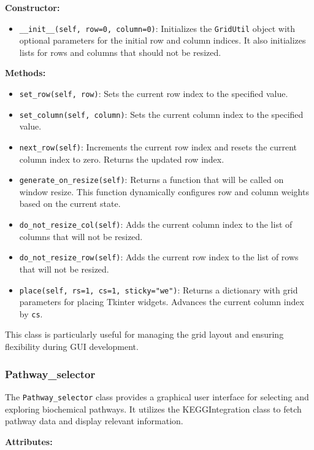 \textbf{Constructor:}

\begin{itemize}
\item \texttt{\_\_init\_\_(self, row=0, column=0)}: Initializes the \texttt{GridUtil} object with optional parameters for the initial row and column indices. It also initializes lists for rows and columns that should not be resized.
\end{itemize}

\textbf{Methods:}

\begin{itemize}
\item \texttt{set\_row(self, row)}: Sets the current row index to the specified value.
\item \texttt{set\_column(self, column)}: Sets the current column index to the specified value.
\item \texttt{next\_row(self)}: Increments the current row index and resets the current column index to zero. Returns the updated row index.
\item \texttt{generate\_on\_resize(self)}: Returns a function that will be called on window resize. This function dynamically configures row and column weights based on the current state.
\item \texttt{do\_not\_resize\_col(self)}: Adds the current column index to the list of columns that will not be resized.
\item \texttt{do\_not\_resize\_row(self)}: Adds the current row index to the list of rows that will not be resized.
\item \texttt{place(self, rs=1, cs=1, sticky="we")}: Returns a dictionary with grid parameters for placing Tkinter widgets. Advances the current column index by \texttt{cs}.
\end{itemize}

This class is particularly useful for managing the grid layout and ensuring flexibility during GUI development.


\subsubsection{Pathway\_selector}

The \texttt{Pathway\_selector} class provides a graphical user interface for selecting and exploring biochemical pathways. It utilizes the KEGGIntegration class to fetch pathway data and display relevant information.

\textbf{Attributes:}

